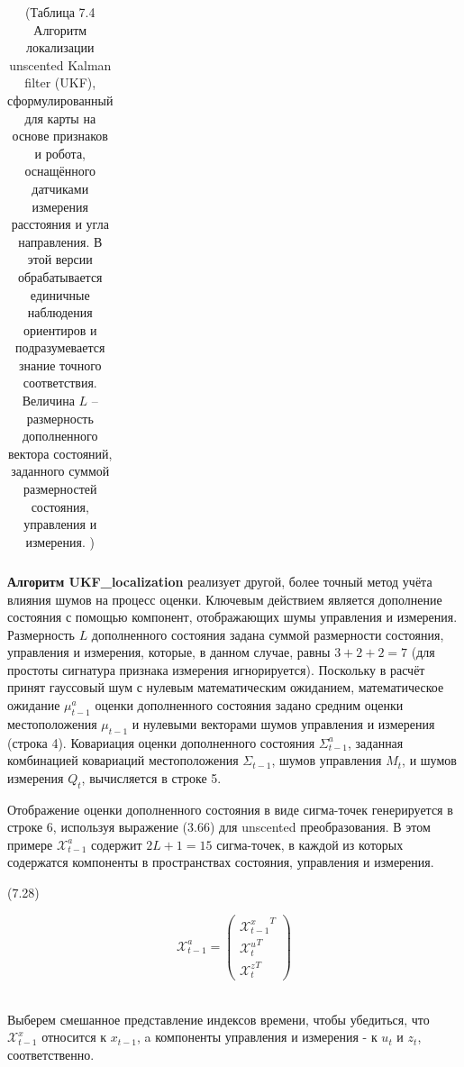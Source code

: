\documentclass[10pt,a4paper]{article}
\begin{document}
\begin{table}[H]
\begin{center}
\begin{tabular}{|l|}
{}\\
\hline
\end{tabular}
\caption{(Таблица 7.4 Алгоритм локализации unscented Kalman filter (UKF), сформулированный для карты на основе признаков и робота, оснащённого датчиками измерения расстояния и угла направления. В этой версии обрабатывается единичные наблюдения ориентиров и подразумевается знание точного соответствия. Величина $L$ – размерность дополненного вектора состояний, заданного суммой размерностей состояния, управления и измерения. )}
\end{center}
\end{table}

\textbf {Алгоритм UKF\_localization} реализует другой, более точный метод учёта влияния шумов на процесс оценки. Ключевым действием является дополнение состояния с помощью компонент, отображающих шумы управления и измерения. Размерность $L$ дополненного состояния задана суммой размерности состояния, управления и измерения, которые, в данном случае, равны $3 + 2 + 2 = 7$ (для простоты сигнатура признака измерения  игнорируется). Поскольку в расчёт принят гауссовый шум с нулевым математическим ожиданием, математическое ожидание $\mu_{t-1}^a$ оценки дополненного состояния задано средним оценки местоположения $\mu_{t-1}$ и нулевыми векторами шумов управления и измерения (строка 4).
Ковариация оценки дополненного состояния $\varSigma_{t-1}^a$, заданная комбинацией ковариаций местоположения $\varSigma_{t-1}$, шумов управления $M_t$, и шумов измерения $Q_t$, вычисляется в строке 5.

Отображение оценки дополненного состояния в виде сигма-точек генерируется в строке 6, используя выражение (3.66) для unscented преобразования. В этом примере $\mathcal{X}_{t-1}^a$ содержит $2L + 1 = 15$ сигма-точек, в каждой из которых содержатся компоненты в пространствах состояния, управления и измерения.

(7.28)
\begin{minipage}{0.2\textwidth}\begin{equation*}
\mathcal{X}_{t-1}^a=
\left(\begin{array}{c}
{\mathcal{X}_{t-1}^x}^T\\
{\mathcal{X}_t^u}^T\\
{\mathcal{X}_t^z}^T
\end{array}\right)
\end{equation*}
\end{minipage}\\

Выберем смешанное представление индексов времени, чтобы убедиться, что $\mathcal{X}_{t-1}^x$ относится к $x_{t-1}$, a компоненты управления и измерения - к $u_t$ и $z_t$, соответственно.
\end{document}
